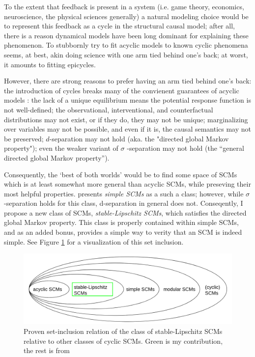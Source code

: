 \documentclass[letterpaper,10pt]{article}
\begin{document}
To the extent that feedback is present in a system (i.e. game theory, economics, neuroscience, the physical sciences generally) a natural modeling choice would be to represent this feedback as a cycle in the structural causal model; after all, there is a reason dynamical models have been long dominant for explaining these phenomenon.
To stubbornly try to fit acyclic models to known cyclic phenomena seems, at best, akin doing science with one arm tied behind one's back; at worst, it amounts to fitting epicycles.

However, there are strong reasons to prefer having an arm tied behind one's back: the introduction of cycles breaks many of the convienent guarantees of acyclic models \cite{Foundations}: the lack of a unique equilibrium means the potential response function is not well-defined; the observational, interventional, and counterfactual distributions may not exist, or if they do, they may not be unique; marginalizing over variables may not be possible, and even if it is, the causal semantics may not be preserved; $d$-separation may not hold (aka. the "directed global Markov property"); even the weaker variant of $\sigma$ -separation may not hold (the “general directed global Markov property”).

Consequently, the `best of both worlds' would be to find some space of SCMs which is at least somewhat more general than acyclic SCMs, while preseving their most helpful properties. \cite{Foundations} presents \emph{simple SCMs} as a such a class; however, while $\sigma$ -separation holds for this class, d-separation in general does not. Conseqently, I propose a new class of SCMs, \emph{stable-Lipschitz SCMs}, which satisfies the directed global Markov property.
This class is properly contained within simple SCMs, and as an added bonus, provides a simple way to verity that an SCM is indeed simple. See Figure \ref{fig:set-inclusion} for a visualization of this set inclusion.

\begin{figure}
\centering
\includegraphics[width=.6\linewidth]{pics/my_own/set_inclusion.png}
\caption{Proven set-inclusion relation of the class of stable-Lipschitz SCMs relative to other classes of cyclic SCMs. Green is my contribution, the rest is from \cite{Foundations}}
\label{fig:set-inclusion}
\end{figure}
\end{document}
